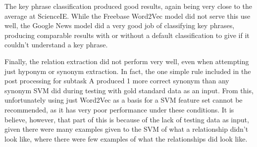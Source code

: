 The key phrase classification produced good results, again being very close to the average at ScienceIE. While the Freebase Word2Vec model did not serve this use well, the Google News model did a very good job of classifying key phrases, producing comparable results with or without a default classification to give if it couldn't understand a key phrase. 

Finally, the relation extraction did not perform very well, even when attempting just hyponym or synonym extraction. In fact, the one simple rule included in the post processing for subtask A produced 1 more correct synonym than any synonym SVM did during testing with gold standard data as an input. From this, unfortunately using just Word2Vec as a basis for a SVM feature set cannot be recommended, as it has very poor performance under these conditions. It is believe, however, that part of this is because of the lack of testing data as input, given there were many examples given to the SVM of what a relationship didn't look like, where there were few examples of what the relationships did look like.


